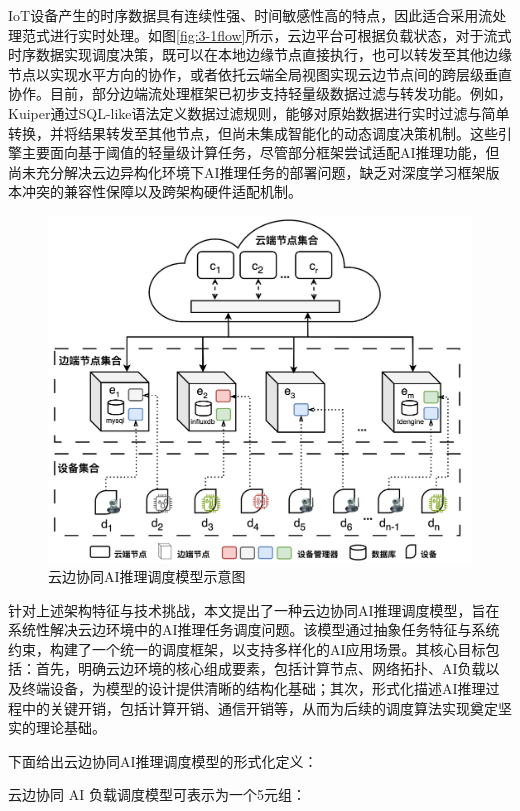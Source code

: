 IoT设备产生的时序数据具有连续性强、时间敏感性高的特点，因此适合采用流处理范式进行实时处理\cite{de2018distributed,wang2020edge}。如图\ref{fig:3-1flow}所示，云边平台可根据负载状态，对于流式时序数据实现调度决策，既可以在本地边缘节点直接执行，也可以转发至其他边缘节点以实现水平方向的协作，或者依托云端全局视图实现云边节点间的跨层级垂直协作。目前，部分边端流处理框架已初步支持轻量级数据过滤与转发功能。例如，Kuiper\cite{ekuiper}通过SQL-like语法定义数据过滤规则，能够对原始数据进行实时过滤与简单转换，并将结果转发至其他节点，但尚未集成智能化的动态调度决策机制。这些引擎主要面向基于阈值的轻量级计算任务，尽管部分框架尝试适配AI推理功能，但尚未充分解决云边异构化环境下AI推理任务的部署问题，缺乏对深度学习框架版本冲突的兼容性保障以及跨架构硬件适配机制。

\begin{figure}[h]
  \centering
  \includegraphics[width=0.9\linewidth]{pics/3-2模型架构.png}
  \caption{云边协同AI推理调度模型示意图}
  \label{fig:3-2model}
\end{figure}

针对上述架构特征与技术挑战，本文提出了一种云边协同AI推理调度模型，旨在系统性解决云边环境中的AI推理任务调度问题。该模型通过抽象任务特征与系统约束，构建了一个统一的调度框架，以支持多样化的AI应用场景。其核心目标包括：首先，明确云边环境的核心组成要素，包括计算节点、网络拓扑、AI负载以及终端设备，为模型的设计提供清晰的结构化基础；其次，形式化描述AI推理过程中的关键开销，包括计算开销、通信开销等，从而为后续的调度算法实现奠定坚实的理论基础。

下面给出云边协同AI推理调度模型的形式化定义：

\begin{definition}[云边协同AI推理调度模型]
云边协同 AI 负载调度模型可表示为一个5元组：
\end{definition}

